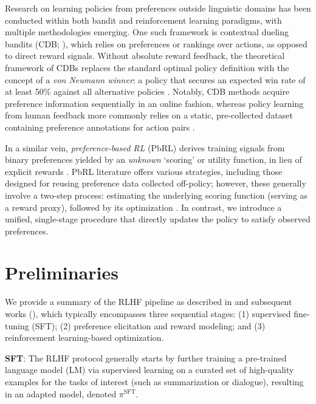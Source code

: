 Research on learning policies from preferences outside linguistic domains has been conducted within both bandit and reinforcement learning paradigms, with multiple methodologies emerging. One such framework is contextual dueling bandits (CDB; \cite{yue2012karmed,dudik2015contextual}), which relies on preferences or rankings over actions, as opposed to direct reward signals. Without absolute reward feedback, the theoretical framework of CDBs replaces the standard optimal policy definition with the concept of a \textit{von Neumann winner}: a policy that secures an expected win rate of at least 50\% against all alternative policies \citep{dudik2015contextual}. Notably, CDB methods acquire preference information sequentially in an online fashion, whereas policy learning from human feedback more commonly relies on a static, pre-collected dataset containing preference annotations for action pairs \citep{yan2022human}. 

In a similar vein, \textit{preference-based RL} (PbRL) derives training signals from binary preferences yielded by an \textit{unknown} `scoring' or utility function, in lieu of explicit rewards \citep{BusaFekete2014,ruiz2023dueling}. PbRL literature offers various strategies, including those designed for reusing preference data collected off-policy; however, these generally involve a two-step process: estimating the underlying scoring function (serving as a reward proxy), followed by its optimization \citep{jain2013learning,BusaFekete2014,christiano2017deep,sadigh2017active,kupcsik2018learning}. In contrast, we introduce a unified, single-stage procedure that directly updates the policy to satisfy observed preferences.

\section{Preliminaries}\label{section:prelims}

We provide a summary of the RLHF pipeline as described in \citeauthor{ziegler2020finetuning} and subsequent works (\citep{stiennon2022learning, bai2022training, ouyang2022training}), which typically encompasses three sequential stages: (1) supervised fine-tuning (SFT); (2) preference elicitation and reward modeling; and (3) reinforcement learning-based optimization.

\textbf{SFT}: The RLHF protocol generally starts by further training a pre-trained language model (LM) via supervised learning on a curated set of high-quality examples for the tasks of interest (such as summarization or dialogue), resulting in an adapted model, denoted $\pi^\text{SFT}$.

